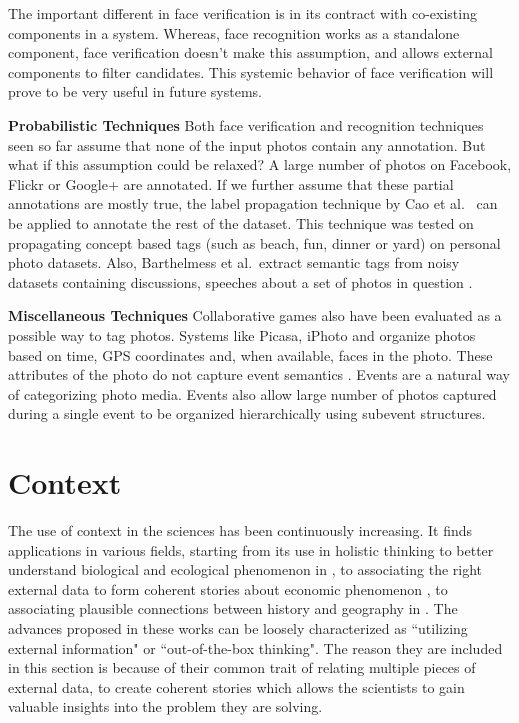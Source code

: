 The important different in face verification is in its contract with co-existing components in a system. Whereas, face recognition works as a standalone component, face verification doesn't make this assumption, and allows external components to filter candidates. This systemic behavior of face verification will prove to be very useful in future systems.

\textbf{Probabilistic Techniques}
Both face verification and recognition techniques seen so far assume that none of the input photos contain any annotation. But what if this assumption could be relaxed? A large number of photos on Facebook, Flickr or Google+ are annotated. If we further assume that these partial annotations are mostly true, the label propagation technique by Cao et al.\ \cite{cao2008annotating} can be applied to annotate the rest of the dataset. This technique was tested on propagating concept based tags (such as beach, fun, dinner or yard) on personal photo datasets. Also, Barthelmess et al.\ extract semantic tags from noisy datasets containing discussions, speeches about a set of photos in question \cite{barthelmess2007toward}. 

\textbf{Miscellaneous Techniques}
Collaborative games also have been evaluated as a possible way to tag photos\cite{diakopoulos2007photoplay}. Systems like Picasa, iPhoto and \cite{graham2002time} organize photos based on time, GPS coordinates and, when available, faces in the photo. These attributes of the photo do not capture event semantics \cite{sawant2011automatic}. Events are a natural way of categorizing photo media. Events also allow large number of photos captured during a single event to be organized hierarchically using subevent structures.

\section{Context}
The use of context in the sciences has been continuously increasing. It finds applications in various fields, starting from its use in holistic thinking to better understand biological and ecological phenomenon in \cite{capra1997web}, to associating the right external data to form coherent stories about economic phenomenon \cite{levitt2006freakonomics}, to associating plausible connections between history and geography in \cite{diamond1997guns}. The advances proposed in these works can be loosely characterized as ``utilizing external information" or ``out-of-the-box thinking". The reason they are included in this section is because of their common trait of relating multiple pieces of external data, to create coherent stories which allows the scientists to gain valuable insights into the problem they are solving.

